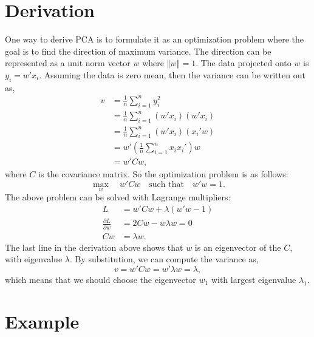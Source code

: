 \documentclass{article}
\begin{document}
\section{Derivation}

One way to derive PCA is to formulate it as an optimization problem where the goal is to find the direction of maximum variance.  The direction can be represented as a unit norm vector $w$ where $\left\Vert w \right\Vert = 1$.  The data projected onto $w$ is $y_i = w'x_i$.  Assuming the data is zero mean, then the variance can be written out as,
\begin{align}
v &= \frac{1}{n} \sum_{i=1}^n y_i^2 \\
  &= \frac{1}{n} \sum_{i=1}^n (w' x_i)(w' x_i) \\
  &= \frac{1}{n} \sum_{i=1}^n (w' x_i)(x_i' w) \\
  &= w' \left(\frac{1}{n} \sum_{i=1}^n x_i x_i'\right) w \\
  &= w' C w,
\end{align}
where $C$ is the covariance matrix.  So the optimization problem is as follows:
\begin{equation}
\max_w \quad w' C w \quad \text{such that} \quad  w'w = 1.
\end{equation}
The above problem can be solved with Lagrange multipliers:
\begin{align}
L &=  w' C w + \lambda (w'w - 1) \\
\frac{\partial L}{\partial w} &= 2Cw - w\lambda w = 0 \\
Cw &= \lambda w.
\end{align}
The last line in the derivation above shows that $w$ is an eigenvector of the $C$, with eigenvalue $\lambda$.  By substitution, we can compute the variance as,
\begin{equation}
v = w' C w = w' \lambda w = \lambda,
\end{equation}
which means that we should choose the eigenvector $w_1$ with largest eigenvalue $\lambda_1$.

\section{Example}
\end{document}
